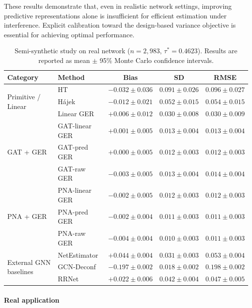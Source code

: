 \documentclass[twoside,letterpaper]{article}
\theoremstyle{plain}
\theoremstyle{definition}
\theoremstyle{remark}
\begin{document}
These results demonstrate that, even in realistic network settings, improving predictive representations alone is insufficient for efficient estimation under interference. Explicit calibration toward the design-based variance objective is essential for achieving optimal performance.
\begin{table}[htbp]
\centering
\caption{Semi-synthetic study on real network ($n=2{,}983$, $\tau^* = 0.4623$). 
Results are reported as mean $\pm$ 95\% Monte Carlo confidence intervals.}
\small
\begin{tabular}{llccc}
\toprule
Category & Method & Bias & SD & RMSE \\
\midrule
\multirow{3}{*}{Primitive / Linear}
& HT 
& $-0.032 \pm 0.036$ 
& $0.091 \pm 0.026$ 
& $0.096 \pm 0.027$ \\
& H\'{a}jek 
& $-0.012 \pm 0.021$ 
& $0.052 \pm 0.015$ 
& $0.054 \pm 0.015$ \\
& Linear GER 
& $+0.006 \pm 0.012$ 
& $0.030 \pm 0.008$ 
& $0.030 \pm 0.009$ \\
\midrule
\multirow{3}{*}{GAT + GER}
& GAT-linear GER 
& $+0.001 \pm 0.005$ 
& $0.013 \pm 0.004$ 
& $0.013 \pm 0.004$ \\
& GAT-pred GER 
& $+0.000 \pm 0.005$ 
& $0.012 \pm 0.003$ 
& $0.012 \pm 0.003$ \\
& GAT-raw GER 
& $-0.003 \pm 0.005$ 
& $0.013 \pm 0.004$ 
& $0.014 \pm 0.004$ \\
\midrule
\multirow{3}{*}{PNA + GER}
& PNA-linear GER 
& $-0.002 \pm 0.005$ 
& $0.012 \pm 0.003$ 
& $0.012 \pm 0.003$ \\
& PNA-pred GER 
& $\mathbf{-0.002 \pm 0.004}$ 
& $\mathbf{0.011 \pm 0.003}$ 
& $\mathbf{0.011 \pm 0.003}$ \\
& PNA-raw GER 
& $-0.004 \pm 0.004$ 
& $\mathbf{0.010 \pm 0.003}$ 
& $\mathbf{0.011 \pm 0.003}$ \\
\midrule
\multirow{3}{*}{External GNN baselines}
& NetEstimator 
& $+0.044 \pm 0.004$ 
& $0.031 \pm 0.003$ 
& $0.053 \pm 0.004$ \\
& GCN-Deconf 
& $-0.197 \pm 0.002$ 
& $0.018 \pm 0.002$ 
& $0.198 \pm 0.002$ \\
& RRNet 
& $+0.022 \pm 0.006$ 
& $0.042 \pm 0.004$ 
& $0.047 \pm 0.005$ \\
\bottomrule
\end{tabular}
\label{tab:semi_synthetic_full}
\end{table}
\paragraph{Real application}
\end{document}
